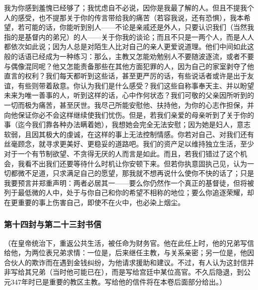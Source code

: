 我为你感到羞愧已经够了；我忧虑自不必说，因你是我最了解的人。但且不提我个人的感受，也不提那关于你的传言带给我的痛苦（若容我说，还有恐惧），我本希望，若可能的话，你能听到别人——不论是亲戚还是外人，只要认识我们（当然我指的是基督内的弟兄）的人——关于你我的谈论；而且不只是一两个人，而是人人都依次如此说；因为人总是对陌生人比对自己的亲人更爱说道理。他们中间如此这般的话语已经成为一种练习：那么，主教又怎能劝勉别人不要随波逐流，或者不要与偶像混同呢？他又怎能责备那些在其他方面犯罪的人，因为自己的家室剥夺了他直言的权利？我们每天都听到这些话，甚至更严厉的话，有些说话者或许是出于友谊，有些则带着敌意。你认为我们是什么感受？我们这些自称事奉天主、并以盼望未来为唯一善事的人，听到这样的话，心中作何状态？我们可敬的父亲因所听到的一切而极为痛苦，甚至厌世。我尽己所能安慰他、扶持他，为你的心志作担保，并向他保证你必不会这样继续使我们忧伤。但是，若我们亲爱的母亲听到了关于你的事（迄今我们靠各种办法瞒着她），我想她会完全无法安慰；因为她是妇人，意志软弱，且因其极大的虔诚，在这样的事上无法控制情感。你若对自己、对我们还有丝毫顾念，就寻求更美好、更稳妥的道路吧。我们的资产足以维持独立生活，至少对于一个有节制欲望、不贪得无厌的人而言是如此。而且，若我们错过了这个机会，我看不出我们还要等待什么时机让你安顿下来。但若你执意固执己见，认为一切都微不足道，只求满足自己的愿望，那我就不想再说什么使你不快的话了；只是我要预言并郑重声明：两者必居其一——要么你仍然作一个真正的基督徒，但将被列于最低微的人中，处于与你自己和你的希望不相称的地位；要么你追逐荣耀，却在更重要的事上伤害自己，即使不在火中，也必染上烟尘。\par


\subsubsection{第十四封与第二十三封书信}

（在皇帝统治下，重返公共生活，被任命为财务官。他在此任上时，他的兄弟写信给他，为两位表兄弟求情：一位是，后来继任主教，与关系亲密；另一位是，他因合伙人的欺诈而在遇到金钱纠纷，为他请求援助和建议。不过，有人认为这封信并非写给其兄弟（当时他可能已在），而是写给宫廷中某位高官。不久后隐退，到公元347年时已是重要的教区主教。写给他的信件将在本卷后面部分给出。）\par

